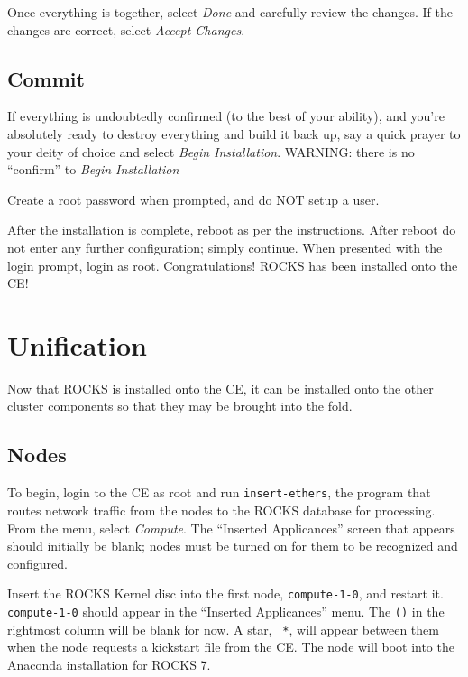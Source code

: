 \documentclass[12pt]{article}
\begin{document}
\qq Once everything is together, select \textit{Done} and carefully review the
changes. If the changes are correct, select \textit{Accept Changes}.

\subsection{Commit}

\qq If everything is undoubtedly confirmed (to the best of your ability), and
you're absolutely ready to destroy everything and build it back up, say a quick
prayer to your deity of choice and select \textit{Begin Installation}. WARNING:
there is no ``confirm'' to \textit{Begin Installation}

\qq Create a root password when prompted, and do NOT setup a user.

\qq After the installation is complete, reboot as per the instructions. After
reboot do not enter any further configuration; simply continue. When presented
with the login prompt, login as root. Congratulations! ROCKS has been installed
onto the CE!



\section{Unification}

\qq Now that ROCKS is installed onto the CE, it can be installed onto the other
cluster components so that they may be brought into the fold.

\subsection{Nodes}

\qq To begin, login to the CE as root and run {\tt insert-ethers}, the program
that routes network traffic from the nodes to the ROCKS database for processing.
From the menu, select \textit{Compute}. The ``Inserted Applicances'' screen that
appears should initially be blank; nodes must be turned on for them to be
recognized and configured.

\qq Insert the ROCKS Kernel disc into the first node, {\tt compute-1-0}, and
restart it. {\tt compute-1-0} should appear in the ``Inserted Applicances''
menu. The {\tt ()} in the rightmost column will be blank for now. A star, {\tt
  *}, will appear between them when the node requests a kickstart file from the
CE. The node will boot into the Anaconda installation for ROCKS 7.
\end{document}
